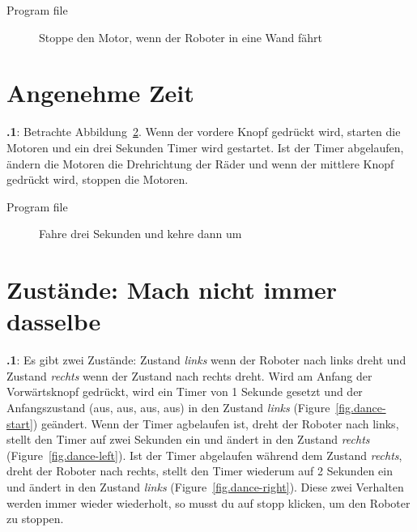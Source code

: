 \documentclass[12pt,a4paper,english]{article}
\begin{document}
{\raggedleft \hfill Program file }

\begin{figure}[hbt]
\begin{center}
\caption{Stoppe den Motor, wenn der Roboter in eine Wand fährt}\label{fig.bump}
\end{center}
\end{figure}


\section{Angenehme Zeit}

\textbf{\thesection.1}:
Betrachte Abbildung~\ref{fig.three}. Wenn der vordere Knopf gedrückt wird, starten die Motoren und ein drei Sekunden Timer wird gestartet. Ist der Timer abgelaufen, ändern die Motoren die Drehrichtung der Räder und wenn der mittlere Knopf gedrückt wird, stoppen die Motoren.

{\raggedleft \hfill Program file }


\begin{figure}[hbt]
\begin{center}
\caption{Fahre drei Sekunden und kehre dann um}\label{fig.three}
\end{center}
\end{figure}


\section{Zustände: Mach nicht immer dasselbe}

\textbf{\thesection.1}:
Es gibt zwei Zustände: Zustand \emph{links}  wenn der Roboter nach links dreht und Zustand \emph{rechts}   wenn der Zustand nach rechts dreht. Wird am Anfang der Vorwärtsknopf gedrückt, wird  ein Timer von 1 Sekunde gesetzt und der Anfangszustand (aus, aus, aus, aus) in den Zustand \emph{links} (Figure~\ref{fig.dance-start}) geändert. Wenn der Timer agbelaufen ist, dreht der Roboter nach links, stellt den Timer auf zwei Sekunden ein und ändert in den Zustand \emph{rechts} (Figure~\ref{fig.dance-left}). 
Ist der Timer abgelaufen während dem Zustand \emph{rechts}, dreht der Roboter nach rechts, stellt den Timer wiederum auf 2 Sekunden ein und ändert in den Zustand \emph{links} (Figure~\ref{fig.dance-right}). Diese zwei Verhalten werden immer wieder wiederholt, so musst du auf stopp  klicken, um den Roboter zu stoppen.
\end{document}
